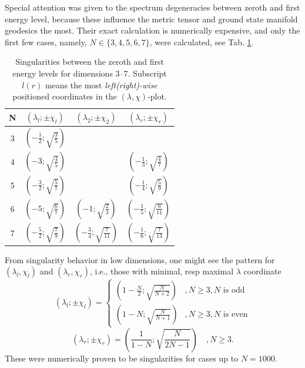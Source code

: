 Special attention was given to the spectrum degeneracies between zeroth and first energy level, because these influence the metric tensor and ground state manifold geodesics the most. Their exact calculation is numerically expensive, and only the first few cases, namely, $N\in\{3,4,5,6,7\}$, were calculated, see Tab. \ref{tab:singularities}. 
\begin{table}[H]
    \centering
    \begin{tabular}{c||c|c|c}
     N&$(\lambda_l;\pm\chi_l)$&$(\lambda_2;\pm\chi_2)$&$(\lambda_r;\pm\chi_r)$        \\ \hline\hline
     3&$(-\frac{1}{2};\sqrt{\frac{3}{5}}) $&                                       &                                         \\
     4&$(-3          ;\sqrt{\frac{4}{5}}) $&                                       & $(-\frac{1}{3};\sqrt{\frac{4}{7}})$     \\
     5&$(-\frac{3}{2};\sqrt{\frac{5}{7}}) $&                                       & $(-\frac{1}{4};\sqrt{\frac{5}{9}})$     \\
     6&$(-5          ;\sqrt{\frac{6}{7}}) $&$(-1          ;\sqrt{\frac{2}{3}}) $   & $(-\frac{1}{5};\sqrt{\frac{6}{11}})$     \\
     7&$(-\frac{5}{2};\sqrt{\frac{7}{9}}) $&$(-\frac{3}{4};\sqrt{\frac{7}{11}}) $  & $(-\frac{1}{6};\sqrt{\frac{7}{13}})$ 
    \end{tabular}
    \caption{Singularities between the zeroth and first energy levels for dimensions 3--7. Subscript $l(r)$ means the most \emph{left(right)-wise} positioned coordinates in the $(\lambda,\chi)$-plot.}
    \label{tab:singularities}
    \end{table} 

From singularity behavior in low dimensions, one might see the pattern for $(\lambda_l,\chi_l)$ and $(\lambda_r,\chi_r)$, i.e., those with minimal, resp maximal $\lambda$ coordinate
\begin{equation}
    (\lambda_l ;\pm\chi_l)= \begin{cases}
        \left(1-\frac{N}{2};\sqrt{\frac{N}{N+2}}\right) & , N\geq 3,N\text{ is odd}\\
        \left(1-N;\sqrt{\frac{N}{N+1}}\right) & , N\geq 3,N\text{ is even}
    \end{cases}
    \label{eq:singularityCoordinateFormulaLeft}
\end{equation}
\begin{equation}
    (\lambda_r ;\pm\chi_r)= 
        \left(\frac{1}{1-N};\sqrt{\frac{N}{2N-1}}\right)\quad , N\geq 3.
        \label{eq:singularityCoordinateFormulaRight}
\end{equation}
These were numerically proven to be singularities for cases up to $N=1000$. 

